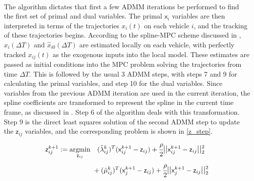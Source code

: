 \documentclass[letterpaper, 10 pt, conference]{ieeeconf}
\DeclareMathOperator*{\argmin}{argmin}
\newcommand{\cx}{\textsf{x}}
\newcommand{\cz}{\textsf{z}}
\begin{document}
\\
\indent
The algorithm dictates that first a few ADMM iterations be performed to find the first set of primal and dual variables. The primal $\cx_{i}$ variables are then interpreted in terms of the trajectories $x_i(t)$ on each vehicle $i$, and the tracking of these trajectories begins. According to the spline-MPC scheme discussed in \cite{c16}, $\hat{x}_i(\Delta T)$ and $\hat{x}_{i0}(\Delta T)$ are estimated locally on each vehicle, with perfectly tracked $x_{ij}(t)$ as the exogenous inputs into the local model. These estimates are passed as initial conditions into the MPC problem solving the trajectories from time $\Delta T$. This is followed by the usual 3 ADMM steps, with steps 7 and 9 for calculating the primal variables, and step 10 for the dual variables. Since variables from the previous ADMM iteration are used in the current iteration, the spline coefficients are transformed to represent the spline in the current time frame, as discussed in \cite{c16}. Step 6 of the algorithm deals with this transformation. Step 9 is the direct least squares solution of the second ADMM step to update the $\cz_{ij}$ variables, and the corresponding problem is shown in \eqref{z_step}.
\begin{equation}
\label{z_step}
\begin{aligned} \cz_{ij}^{k+1} &:=
 \argmin_{\cz_{ij}} \quad (\tilde{\lambda}^k_{ij})^T(\cx^{k+1}_{ij} - \cz_{ij}) + \cfrac{\rho}{2} \mathlarger{||}\cx^{k+1}_{ij} - \cz_{ij}\mathlarger{||}_2^2{{}} \\ & \qquad \quad \quad \quad
+ (\tilde{\mu}^k_{ij})^T(\cx^{k+1}_{j} - \cz_{ij}) +
\cfrac{\rho}{2} \mathlarger{||}\cx^{k+1}_{j} - \cz_{ij}\mathlarger{||}_2^2 \mathlarger{}
\end{aligned}
\end{equation}
\\
\indent
\end{document}
